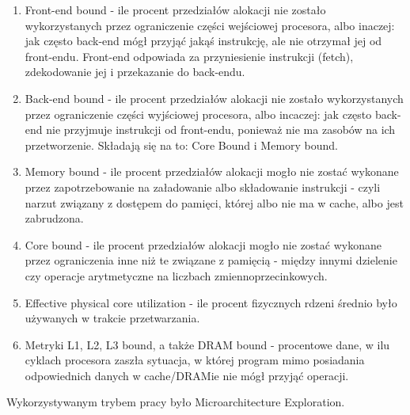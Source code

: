 \documentclass[12pt]{article}
\begin{document}
\begin{enumerate}
\begin{enumerate}
		\item Front-end bound - ile procent przedziałów alokacji nie zostało wykorzystanych przez ograniczenie części wejściowej procesora, albo inaczej: jak często back-end mógł przyjąć jakąś instrukcję, ale nie otrzymał jej od front-endu. Front-end odpowiada za przyniesienie instrukcji (fetch), zdekodowanie jej i przekazanie do back-endu.
		
		\item Back-end bound - ile procent przedziałów alokacji nie zostało wykorzystanych przez ograniczenie części wyjściowej procesora, albo incaczej: jak często back-end nie przyjmuje instrukcji od front-endu, ponieważ nie ma zasobów na ich przetworzenie. Składają się na to: Core Bound i Memory bound.
		\item Memory bound - ile procent przedziałów alokacji mogło nie zostać wykonane przez zapotrzebowanie na załadowanie albo składowanie instrukcji - czyli narzut związany z dostępem do pamięci, której albo nie ma w cache, albo jest zabrudzona.
		\item Core bound - ile procent przedziałów alokacji mogło nie zostać wykonane przez ograniczenia inne niż te związane z pamięcią - między innymi dzielenie czy operacje arytmetyczne na liczbach zmiennoprzecinkowych.
		\item Effective physical core utilization - ile procent fizycznych rdzeni średnio było używanych w trakcie przetwarzania.
		\item Metryki L1, L2, L3 bound, a także DRAM bound - procentowe dane, w ilu cyklach procesora zaszła sytuacja, w której program mimo posiadania odpowiednich danych w cache/DRAMie nie mógł przyjąć operacji.
	\end{enumerate}
	Wykorzystywanym trybem pracy było Microarchitecture Exploration.
\end{enumerate}
\end{document}
